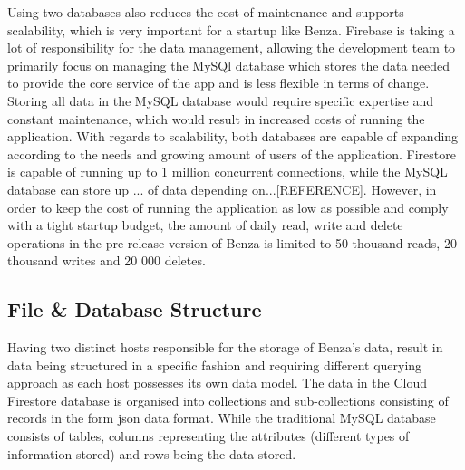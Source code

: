 \documentclass{article}
\begin{document}
    Using two databases also reduces the cost of maintenance and supports scalability, which is very important for a startup like Benza. Firebase is taking a lot of responsibility for the data management, allowing the development team to primarily focus on managing the MySQl database which stores the data needed to provide the core service of the app and is less flexible in terms of change. Storing all data in the MySQL database would require specific expertise and constant maintenance, which would result in increased costs of running the application. With regards to scalability, both databases are capable of expanding according to the needs and growing amount of users of the application. Firestore is capable of running up to 1 million concurrent connections, while the MySQL database can store up ... of data depending on...[REFERENCE]. However, in order to keep the cost of running the application as low as possible and comply with a tight startup budget, the amount of daily read, write and delete operations in the pre-release version of Benza is limited to 50 thousand reads, 20 thousand writes and 20 000 deletes. \par
    
    \subsection{File \& Database Structure}
    \label{subsec:fileanddatabasestructure}
    
     Having two distinct hosts responsible for the storage of Benza's data, result in data being structured in a specific fashion and requiring different querying approach as each host possesses its own data model. The data in the Cloud Firestore database is organised into collections and sub-collections consisting of records in the form \acrshort{json} data format. While the traditional MySQL database consists of tables, columns representing the attributes (different types of information stored) and rows being the data stored. 
    
\end{document}
